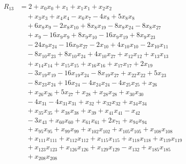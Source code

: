 \begin{align*}
R_{13}&={}2 +x_{0}x_{0} +x_{1} +x_{1}x_{1} +x_{2}x_{2}\\
&\quad{}+x_{3}x_{3} +x_{4}x_{4} -x_{6}x_{7} -4x_{8} +5x_{8}x_{8}\\
&\quad{}+6x_{8}x_{9} -2x_{8}x_{10} +8x_{8}x_{19} -8x_{8}x_{24} -8x_{8}x_{27}\\
&\quad{}+x_{9} -16x_{9}x_{9} +8x_{9}x_{10} -16x_{9}x_{19} +8x_{9}x_{23}\\
&\quad{}-24x_{9}x_{24} -16x_{9}x_{27} -2x_{10} +4x_{10}x_{10} -2x_{10}x_{11}\\
&\quad{}-8x_{10}x_{23} +8x_{10}x_{24} +4x_{10}x_{27} +x_{12}x_{12} +x_{13}x_{13}\\
&\quad{}+x_{14}x_{14} +x_{15}x_{15} +x_{16}x_{16} +x_{17}x_{17} +2x_{19}\\
&\quad{}-3x_{19}x_{19} -16x_{19}x_{24} -8x_{19}x_{27} +x_{22}x_{22} +5x_{23}\\
&\quad{}-8x_{23}x_{24} +16x_{24} -4x_{24}x_{24} -4x_{25}x_{25} +x_{26}\\
&\quad{}+x_{26}x_{26} +5x_{27} +x_{28} +x_{28}x_{28} +x_{30}x_{30}\\
&\quad{}-4x_{31} -4x_{31}x_{31} +x_{32} +x_{32}x_{32} +x_{34}x_{34}\\
&\quad{}+x_{35}x_{35} +x_{38}x_{38} +x_{39} +x_{41}x_{41} -x_{42}\\
&\quad{}-3x_{43} +x_{60}x_{60} +x_{61}x_{61} +2x_{71} +x_{94}x_{94}\\
&\quad{}+x_{95}x_{95} +x_{99}x_{99} +x_{102}x_{102} +x_{105}x_{105} +x_{108}x_{108}\\
&\quad{}+x_{111}x_{111} +x_{112}x_{112} +x_{115}x_{115} +x_{118}x_{118} +x_{119}x_{119}\\
&\quad{}+x_{123}x_{123} +x_{126}x_{126} +x_{129}x_{129} -x_{132} +x_{185}x_{185}\\
&\quad{}+x_{208}x_{208}
\end{align*}

